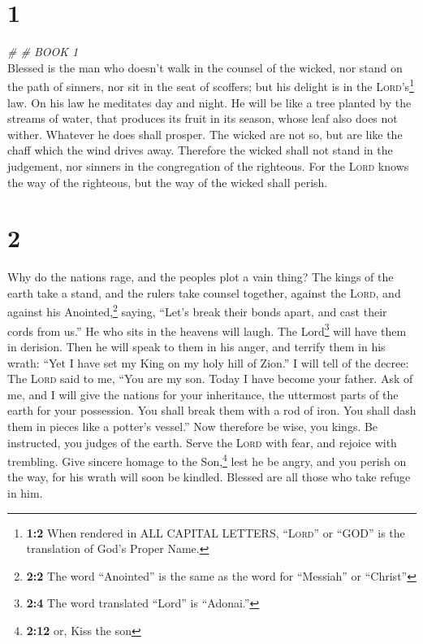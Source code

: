 \hypertarget{section}{%
\section{1}\label{section}}

\emph{\# \# BOOK 1}\\

 Blessed is the man who doesn't walk in the counsel of the
wicked, nor stand on the path of sinners, nor sit in the seat of
scoffers;  but his delight is in the
\textsc{Lord}'s\footnote{\textbf{1:2} When rendered in ALL CAPITAL
  LETTERS, ``\textsc{Lord}'' or ``GOD'' is the translation of God's
  Proper Name.} law. On his law he meditates day and night.
 He will be like a tree planted by the streams of water,
that produces its fruit in its season, whose leaf also does not wither.
Whatever he does shall prosper.  The wicked are not so,
but are like the chaff which the wind drives away. 
Therefore the wicked shall not stand in the judgement, nor sinners in
the congregation of the righteous.  For the \textsc{Lord}
knows the way of the righteous, but the way of the wicked shall perish.

\hypertarget{section-1}{%
\section{2}\label{section-1}}

 Why do the nations rage, and the peoples plot a vain
thing?  The kings of the earth take a stand, and the
rulers take counsel together, against the \textsc{Lord}, and against his
Anointed,\footnote{\textbf{2:2} The word ``Anointed'' is the same as the
  word for ``Messiah'' or ``Christ''} saying,  ``Let's
break their bonds apart, and cast their cords from us.'' 
He who sits in the heavens will laugh. The Lord\footnote{\textbf{2:4}
  The word translated ``Lord'' is ``Adonai.''} will have them in
derision.  Then he will speak to them in his anger, and
terrify them in his wrath:  ``Yet I have set my King on my
holy hill of Zion.''  I will tell of the decree: The
\textsc{Lord} said to me, ``You are my son. Today I have become your
father.  Ask of me, and I will give the nations for your
inheritance, the uttermost parts of the earth for your possession.
 You shall break them with a rod of iron. You shall dash
them in pieces like a potter's vessel.''  Now therefore
be wise, you kings. Be instructed, you judges of the earth.
 Serve the \textsc{Lord} with fear, and rejoice with
trembling.  Give sincere homage to the Son,\footnote{\textbf{2:12}
  or, Kiss the son} lest he be angry, and you perish on the way, for his
wrath will soon be kindled. Blessed are all those who take refuge in
him.

